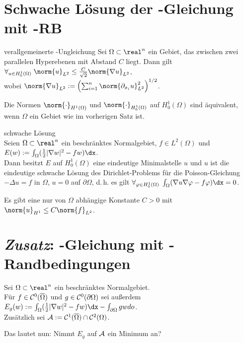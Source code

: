 \section{%
    Schwache Lösung der -Gleichung mit -RB%
}

\begin{Satz}{verallgemeinerte -Ungleichung}
    Sei $\Omega \subset \real^n$ ein Gebiet, das zwischen zwei parallelen Hyperebenen
    mit Abstand $C$ liegt.
    Dann gilt $\forall_{u \in H^1_0(\Omega)}\;
    \norm{u}_{L^2} \le \frac{C}{\sqrt{2}} \norm{\nabla u}_{L^2}$,\\
    wobei $\norm{\nabla u}_{L^2} :=
    \left(\sum_{i=1}^n \norm{\partial_{x_i} u}_{L^2}^2\right)^{1/2}$.
\end{Satz}

\begin{Kor}
    Die Normen $\norm{\cdot}_{H^1(\Omega)}$ und $\norm{\cdot}_{H_0^1(\Omega)}$ auf $H_0^1(\Omega)$
    sind äquivalent, wenn $\Omega$ ein Gebiet wie im vorherigen Satz ist.
\end{Kor}

\linie

\begin{Satz}{schwache Lösung}\\
    Seien $\Omega \subset \real^n$ ein beschränktes Normalgebiet, $f \in L^2(\Omega)$ und
    $E(w) := \int_\Omega (\frac{1}{2} |\nabla w|^2 - fw)\dx$.\\
    Dann besitzt $E$ auf $H_0^1(\Omega)$ eine eindeutige Minimalstelle $u$ und $u$ ist die
    eindeutige schwache Lösung des Dirichlet-Problems für die Poisson-Gleichung
    $-\Delta u = f$ in $\Omega$, $u = 0$ auf $\partial\Omega$, d.\,h. es gilt
    $\forall_{\varphi \in H_0^1(\Omega)}\; \int_\Omega (\nabla u \nabla \varphi - f\varphi)\dx = 0$.
\end{Satz}

\begin{Bem}
    Es gibt eine nur von $\Omega$ abhängige Konstante $C > 0$ mit
    $\norm{u}_{H^1} \le C \norm{f}_{L^2}$.
\end{Bem}

\pagebreak

\section{%
    \emph{Zusatz}: -Gleichung mit -Randbedingungen%
}

\begin{Bem}
    Sei $\Omega \subset \real^n$ ein beschränktes Normalgebiet.\\
    Für $f \in \mathcal{C}^0(\overline{\Omega})$ und $g \in \mathcal{C}^0(\partial\Omega)$ sei außerdem
    $E_g(w) := \int_\Omega (\frac{1}{2} |\nabla w|^2 - fw) \dx - \int_{\partial\Omega} gw do$.\\
    Zusätzlich sei $\mathcal{A} := \mathcal{C}^1(\overline{\Omega}) \cap \mathcal{C}^2(\Omega)$.

    Das  lautet nun:
    Nimmt $E_g$ auf $\mathcal{A}$ ein Minimum an?
\end{Bem}

